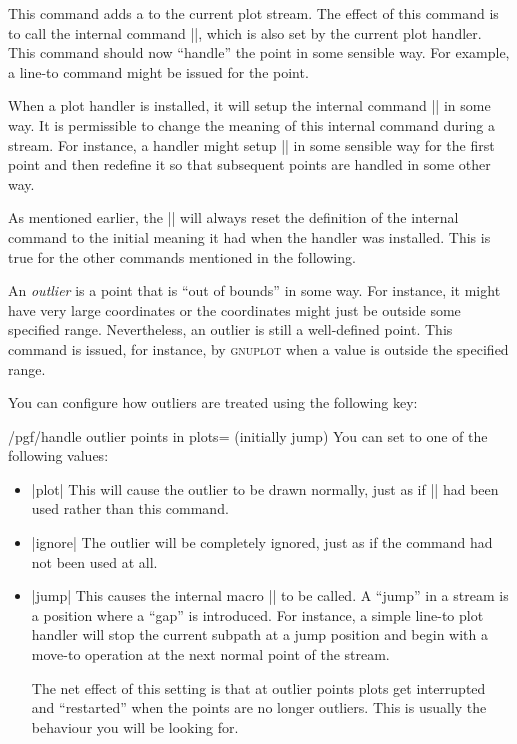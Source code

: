 \begin{command}{\pgfplotstreampoint{}}
  This command adds a  to the current plot stream. The
  effect of this command is to call the internal command |\pgf@plotstreampoint|,
  which is also set by the current plot handler. This command should
  now ``handle'' the point in some sensible way. For example, a
  line-to command might be issued for the point.
  
  When a plot handler is installed, it will setup the internal command
  |\pgf@plotstreampoint| in some way. It is permissible to change the
  meaning of this internal command during a stream. For instance, a
  handler might setup |\pgf@plotstreampoint| in some sensible way for
  the first point and then redefine it so that subsequent points are
  handled in some other way.

  As mentioned earlier, the |\pgfplotstreamstart| will always reset
  the definition of the internal command to the initial meaning it had
  when the handler was installed. This is true for the other commands
  mentioned in the following.
\end{command}

\begin{command}{\pgfplotstreampointoutlier{}}
  An \emph{outlier} is a point that is ``out of bounds'' in some
  way. For instance, it might have very large coordinates or the
  coordinates might just be outside some specified
  range. Nevertheless, an outlier is still a well-defined point. This
  command is issued, for instance, by \textsc{gnuplot} when a value is
  outside the specified range.

  You can configure how outliers are treated using the following key:
  \begin{key}{/pgf/handle outlier points in plots=
      (initially jump)}
    You can set  to one of the following values:
    \begin{itemize}
    \item |plot| This will cause the outlier to be drawn normally,
      just as if |\pgfplotstreampoint| had been used rather than this
      command.
    \item |ignore| The outlier will be completely ignored, just as if
      the command had not been used at all.
    \item |jump| This causes the internal macro |\pgf@plotstreamjump|
      to be called. A ``jump'' in a stream is a position where a
      ``gap'' is introduced. For instance, a simple line-to plot
      handler will stop the current subpath at a jump position and
      begin with a move-to operation at the next normal point of the
      stream.

      The net effect of this setting is that at outlier points plots
      get interrupted and ``restarted'' when the points are no longer
      outliers. This is usually the behaviour you will be looking for.
    \end{itemize}
  \end{key}
\end{command}

